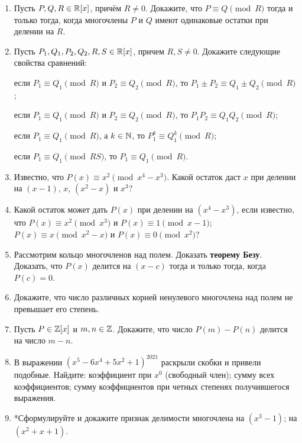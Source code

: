 \begin{enumerate}
\item Пусть $P, Q, R \in \mathbb R[x]$, причём $R\ne 0$. Докажите, что $P \equiv Q\pmod R$ тогда и только тогда,
когда многочлены $P$ и $Q$ имеют одинаковые остатки при делении на $R$.

\item Пусть $P_1, Q_1, P_2, Q_2, R, S \in \mathbb R[x]$, причем $R, S\ne 0$. Докажите следующие свойства сравнений:

\noindent\ipunkt если $P_1 \equiv Q_1 \pmod R$ и $P_2 \equiv Q_2 \pmod R$, то $P_1\pm P_2 \equiv Q_1\pm Q_2\pmod R$;

\noindent\ipunkt если $P_1 \equiv Q_1 \pmod R$ и $P_2 \equiv Q_2 \pmod R$, то $P_1P_2 \equiv Q_1Q_2\pmod R$;

\noindent\ipunkt если $P_1 \equiv Q_1 \pmod R$, а $k \in \mathbb N$, то $P_1^k \equiv Q_1^k\pmod R$;

\noindent\ipunkt если $P_1 \equiv Q_1 \pmod{RS}$, то $P_1 \equiv Q_1 \pmod R$.

\item Известно, что $P(x) \equiv x^2 \pmod{x^4 - x^3}$. Какой остаток даст $x$ при делении на $(x - 1)$,
$x$, $(x^2 - x)$ и $x^3$?

\item Какой остаток может дать $P(x)$ при делении на $(x^4 - x^3)$, если известно, что
\ipunkt $P(x) \equiv x^2 \pmod{x^3}$ и $P(x) \equiv 1 \pmod{x-1}$;
\ipunkt $P(x) \equiv x \pmod{x^2 -x}$ и $P(x) \equiv 0 \pmod{x^2}$?


\item Рассмотрим кольцо многочленов над полем. Доказать \textbf{теорему Безу}. Доказать, что $P(x)$ делится на $(x-c)$ тогда и только тогда, когда $P(c)=0$.

\item Докажите, что число различных корней ненулевого многочлена над полем не превышает его степень.

\item Пусть $P \in \mathbb Z[x]$ и $m, n \in \mathbb Z$. Докажите, что число $P(m) - P(n)$ делится на число $m-n$.

\item В выражении $(x^5 - 6x^4 + 5x^2 + 1)^{2021}$ раскрыли скобки и привели подобные. Найдите:
\ipunkt коэффициент при $x^0$ (свободный член);
\ipunkt сумму всех коэффициентов;
\ipunkt *сумму коэффициентов при четных степенях получившегося выражения.

\item *Сформулируйте и докажите признак делимости многочлена
\ipunkt на $(x^3 - 1)$; \ipunkt на $(x^2 + x + 1)$.


\end{enumerate}







